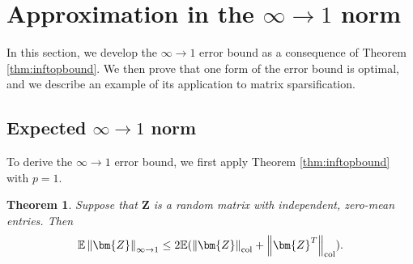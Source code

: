 \documentclass[11pt,letterpaper,twoside,reqno]{amsart}
\newcommand{\mat}[1]{\ensuremath{\bm{#1}}}
\newcommand{\E}{\ensuremath{\mathbb{E}}}
\newcommand{\infonorm}[1]{\ensuremath{\left\|#1\right\|_{\infty\rightarrow 1}}}
\newcommand{\infone}{\ensuremath{\infty\!\rightarrow\!\!1}}
\newcommand{\colnorm}[1]{\ensuremath{\left\|#1\right\|_{\text{\rm col}}}}
\newtheorem{thm}{Theorem}
\begin{document}
\section{Approximation in the $\infone$ norm}

\label{sec:inf1norm}

In this section, we develop the $\infone$ error bound as a consequence of Theorem \ref{thm:inftopbound}. We then prove that one form of the error bound is optimal, and we describe an example of its application to matrix sparsification.

\subsection{Expected $\infone$ norm}
To derive the $\infone$ error bound, we first apply Theorem \ref{thm:inftopbound} with $p=1$.

\begin{thm}
Suppose that $\mat{Z}$ is a random matrix with independent, zero-mean entries. Then 
\[
\E\infonorm{\mat{Z}}\leq2\E(\colnorm{\mat{Z}}+\colnorm{\mat{Z}^{T}}).
\]
\label{thm:inf1errbound}
\end{thm}
\end{document}

